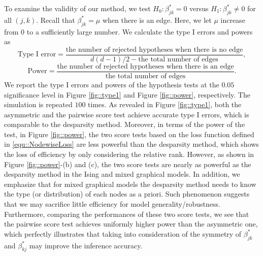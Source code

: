 \documentclass[twoside,11pt]{article}
\begin{document}
To examine the validity of our method, we test   $H_0\colon \beta_{jk}^* = 0$ versus $H_1 \colon \beta_{jk}^* \neq 0$ for all  $(j,k)$. Recall that  $\beta_{jk}^* = \mu$ when there is an edge. 
 Here, we let $\mu$ increase from $0$ to a sufficiently large number.  We calculate the  type I errors and powers as
 $$
 \textrm{Type I error}=\frac{\textrm{the number of rejected hypotheses when there is no edge}}{d(d-1)/2- \textrm{the total number of edges}},
 $$
 $$
 \textrm{Power}=\frac{\textrm{the number of rejected hypotheses when there is an edge}}{\textrm{the total number of edges}}.
 $$
 We report  the type I errors  and powers of the hypothesis tests at the $0.05$ significance level in   Figure \ref{fig::type1} and Figure \ref{fig::power}, respectively.  The simulation is repeated $100$ times.
As revealed in Figure \ref{fig::type1}, both the asymmetric  and the pairwise score test   achieve  accurate type I errors, which is comparable to the desparsity method. 
Moreover, in terms of the power of the test, in Figure \ref{fig::power},
the two score tests based on the loss function defined in \eqref{equ::NodewiseLoss} are less powerful than 
 the desparsity method, which shows the loss of efficiency  by only considering the relative rank. However, as shown in Figure \ref{fig::power}-(b) and (c), the two score tests are nearly as powerful as  the desparsity method in the Ising  and mixed graphical models. 
 In addition, we emphasize that for mixed graphical models the desparsity method needs to know the type (or distribution) of each nodes as a priori. Such phenomenon suggests that we may sacrifice little efficiency for model generality/robustness. Furthermore, comparing the performances of these two score tests, we see that the pairwise score test achieves uniformly higher power than the asymmetric one, which perfectly illustrates that taking into consideration of the symmetry of $\beta_{jk}^*$ and $\beta_{kj}^* $ may improve the inference accuracy. 
\end{document}
